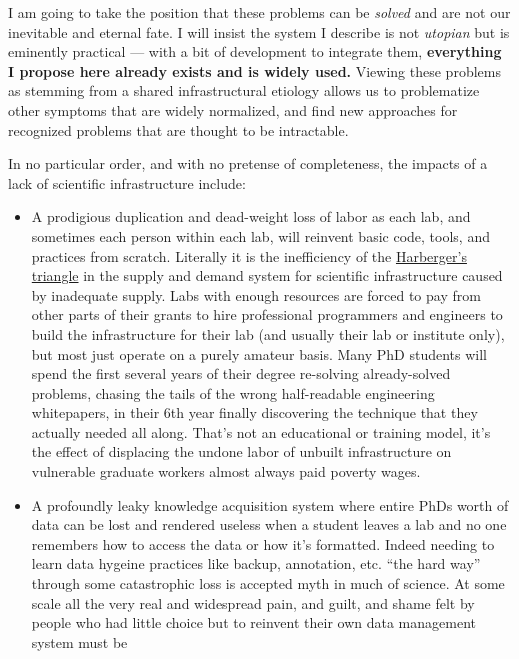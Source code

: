 \documentclass{article}
\begin{document}
I am going to take the position that these problems can be \emph{solved}
and are not our inevitable and eternal fate. I will insist the system I
describe is not \emph{utopian} but is eminently practical --- with a bit
of development to integrate them, \textbf{everything I propose here
already exists and is widely used.} Viewing these problems as stemming
from a shared infrastructural etiology allows us to problematize other
symptoms that are widely normalized, and find new approaches for
recognized problems that are thought to be intractable.

In no particular order, and with no pretense of completeness, the
impacts of a lack of scientific infrastructure include:

\begin{itemize}

\item
  A prodigious duplication and dead-weight loss of labor as each lab,
  and sometimes each person within each lab, will reinvent basic code,
  tools, and practices from scratch. Literally it is the inefficiency of
  the
  \href{https://en.wikipedia.org/wiki/Deadweight_loss\#Harberger's_triangle}{Harberger's
  triangle} in the supply and demand system for scientific
  infrastructure caused by inadequate supply. Labs with enough resources
  are forced to pay from other parts of their grants to hire
  professional programmers and engineers to build the infrastructure for
  their lab (and usually their lab or institute only), but most just
  operate on a purely amateur basis. Many PhD students will spend the
  first several years of their degree re-solving already-solved
  problems, chasing the tails of the wrong half-readable engineering
  whitepapers, in their 6th year finally discovering the technique that
  they actually needed all along. That's not an educational or training
  model, it's the effect of displacing the undone labor of unbuilt
  infrastructure on vulnerable graduate workers almost always paid
  poverty wages.
\item
  A profoundly leaky knowledge acquisition system where entire PhDs
  worth of data can be lost and rendered useless when a student leaves a
  lab and no one remembers how to access the data or how it's formatted.
  Indeed needing to learn data hygeine practices like backup,
  annotation, etc. ``the hard way'' through some catastrophic loss is
  accepted myth in much of science. At some scale all the very real and
  widespread pain, and guilt, and shame felt by people who had little
  choice but to reinvent their own data management system must be

\end{itemize}
\end{document}
